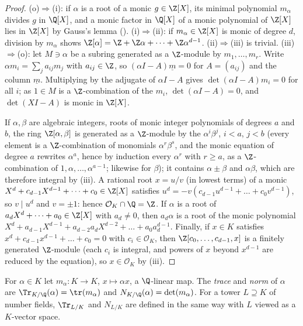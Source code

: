 \begin{proof}
(o)$\Rightarrow$(i): if $\alpha$ is a root of a monic $g\in\Z[X]$, its minimal polynomial $m_\alpha$ divides $g$ in $\Q[X]$, and a monic factor
in $\Q[X]$ of a monic polynomial of $\Z[X]$ lies in $\Z[X]$ by Gauss's lemma (). (i)$\Rightarrow$(ii): if $m_\alpha\in\Z[X]$ is
monic of degree $d$, division by $m_\alpha$ shows $\Z[\alpha]=\Z+\Z\alpha+\dots+\Z\alpha^{d-1}$. (ii)$\Rightarrow$(iii) is trivial.
(iii)$\Rightarrow$(o): let $M\ni\alpha$ be a subring generated as a $\Z$-module by $m_1,\dots,m_r$. Write $\alpha m_i=\sum_ja_{ij}m_j$ with
$a_{ij}\in\Z$, so $(\alpha I-A)\underline m=0$ for $A=(a_{ij})$ and the column $\underline m$. Multiplying by the adjugate of $\alpha I-A$ gives
$\det(\alpha I-A)m_i=0$ for all $i$; as $1\in M$ is a $\Z$-combination of the $m_i$, $\det(\alpha I-A)=0$, and $\det(XI-A)$ is monic in $\Z[X]$.

If $\alpha,\beta$ are algebraic integers, roots of monic integer polynomials of degrees $a$ and $b$, the ring $\Z[\alpha,\beta]$ is generated
as a $\Z$-module by the $\alpha^i\beta^j$, $i<a$, $j<b$ (every element is a $\Z$-combination of monomials $\alpha^r\beta^s$, and the monic equation of degree $a$
rewrites $\alpha^a$, hence by induction every $\alpha^r$ with $r\ge a$, as a $\Z$-combination of $1,\alpha,\dots,\alpha^{a-1}$; likewise for $\beta$); it contains $\alpha\pm\beta$ and $\alpha\beta$, which are therefore integral by (iii).
A rational root $x=u/v$ (in lowest terms) of a monic $X^d+c_{d-1}X^{d-1}+\dots+c_0\in\Z[X]$ satisfies $u^d=-v(c_{d-1}u^{d-1}+\dots+c_0v^{d-1})$, so
$v\mid u^d$ and $v=\pm1$: hence $\mathcal O_K\cap\Q=\Z$. If $\alpha$ is a root of $a_dX^d+\dots+a_0\in\Z[X]$ with $a_d\ne0$, then $a_d\alpha$ is a root
of the monic polynomial $X^d+a_{d-1}X^{d-1}+a_{d-2}a_dX^{d-2}+\dots+a_0a_d^{d-1}$. Finally, if $x\in K$ satisfies $x^d+c_{d-1}x^{d-1}+\dots+c_0=0$
with $c_i\in\mathcal O_K$, then $\Z[c_0,\dots,c_{d-1},x]$ is a finitely generated $\Z$-module (each $c_i$ is integral, and powers of $x$ beyond
$x^{d-1}$ are reduced by the equation), so $x\in\mathcal O_K$ by (iii).
\end{proof}

\begin{definition}\label{def:ant:tracenorm}
For $\alpha\in K$ let $m_\alpha\colon K\to K$, $x\mapsto\alpha x$, a $\Q$-linear map. The \emph{trace} and \emph{norm} of $\alpha$ are
$\Tr_{K/\Q}(\alpha)=\tr(m_\alpha)$ and $N_{K/\Q}(\alpha)=\det(m_\alpha)$. For a tower $L\supseteq K$ of number fields, $\Tr_{L/K}$ and $N_{L/K}$ are
defined in the same way with $L$ viewed as a $K$-vector space.
\end{definition}

